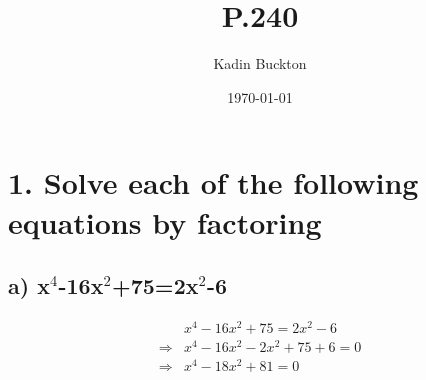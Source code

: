 \documentclass[11pt]{article}
\author{Kadin Buckton}
\date{\today}
\title{P.240}
\begin{document}
\maketitle

\section*{1. Solve each of the following equations by factoring}
\label{sec:orgb5ba5fa}
\subsection*{a) x\(^{\text{4}}\)-16x\(^{\text{2}}\)+75=2x\(^{\text{2}}\)-6}
\label{sec:org6b40ee5}
\begin{align*}
&x^4-16x^2+75=2x^2-6\\
\Rightarrow &x^4-16x^2-2x^2+75+6=0\\
\Rightarrow &x^4-18x^2+81=0\\
\end{align*}
\end{document}
